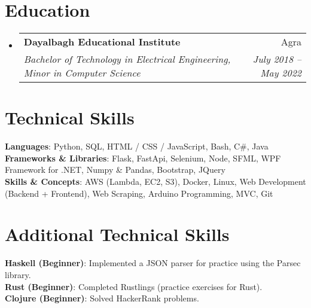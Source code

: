 \documentclass[letterpaper,11pt]{article}
\makeatletter
\newcommand{\resumeSubheading}[4]{
  \vspace{-2pt}\item
    \begin{tabular*}{0.97\textwidth}[t]{l@{\extracolsep{\fill}}r}
      \textbf{#1} & #2 \\
      \textit{\small#3} & \textit{\small #4} \\
    \end{tabular*}\vspace{-7pt}
}
\newcommand{\resumeSubHeadingListStart}{\begin{itemize}[leftmargin=0.15in, label={}]}
\newcommand{\resumeSubHeadingListEnd}{\end{itemize}}
\makeatother
\begin{document}
\section{Education}
  \resumeSubHeadingListStart
    \resumeSubheading
      {Dayalbagh Educational Institute}{Agra}
      {Bachelor of Technology in Electrical Engineering, Minor in Computer Science}{July 2018 -- May 2022}
  \resumeSubHeadingListEnd


\section{Technical Skills}
 \begin{itemize}[leftmargin=0.15in, label={}]
    \small{\item{
     \textbf{Languages}{: Python, SQL, HTML / CSS / JavaScript, Bash, C\#, Java} \\
     \textbf{Frameworks \& Libraries}{: Flask, FastApi, Selenium, Node, SFML, WPF Framework for .NET, Numpy \& Pandas, Bootstrap, JQuery} \\
     \textbf{Skills \& Concepts}{: AWS (Lambda, EC2, S3), Docker, Linux, Web Development (Backend + Frontend), Web Scraping, Arduino Programming, MVC, Git} \\
    }}
 \end{itemize}


\section{Additional Technical Skills}
 \begin{itemize}[leftmargin=0.15in, label={}]
    \small{\item{
     \textbf{Haskell (Beginner)}{: Implemented a JSON parser for practice using the Parsec library.} \\
     \textbf{Rust (Beginner)}{: Completed Rustlings (practice exercises for Rust).} \\
     \textbf{Clojure (Beginner)}{: Solved HackerRank problems.} \\
    }}
 \end{itemize}

\end{document}

